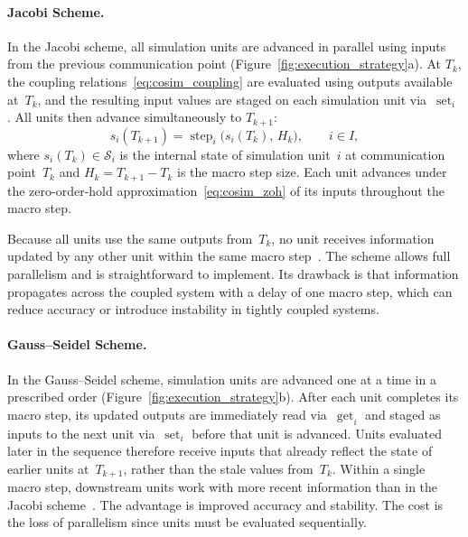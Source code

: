 \paragraph{Jacobi Scheme.}
In the Jacobi scheme, all simulation units are advanced in parallel using inputs from the previous communication point (Figure~\ref{fig:execution_strategy}a).
At $T_k$, the coupling relations~\eqref{eq:cosim_coupling} are evaluated using outputs available at~$T_k$, and the resulting input values are staged on each simulation unit via~$\operatorname{set}_i$.
All units then advance simultaneously to $T_{k+1}$:
\begin{equation}
    s_i(T_{k+1}) = \operatorname{step}_i\!\bigl(s_i(T_k),\, H_k\bigr),
    \qquad i \in I,
    \label{eq:jacobi_step}
\end{equation}
where $s_i(T_k) \in \mathcal{S}_i$ is the internal state of simulation unit~$i$ at communication point~$T_k$ and $H_k = T_{k+1} - T_k$ is the macro step size.
Each unit advances under the zero-order-hold approximation~\eqref{eq:cosim_zoh}
of its inputs throughout the macro step.

Because all units use the same outputs from~$T_k$, no unit receives information updated by any other unit within the same macro step~\cite{petridis_test_2015}.
The scheme allows full parallelism and is straightforward to implement.
Its drawback is that information propagates across the coupled system with a delay of one macro step, which can reduce accuracy or introduce instability in tightly coupled systems.

\paragraph{Gauss--Seidel Scheme.}
In the Gauss--Seidel scheme, simulation units are advanced one at a time in a prescribed order (Figure~\ref{fig:execution_strategy}b).
After each unit completes its macro step, its updated outputs are immediately read via~$\operatorname{get}_i$ and staged as inputs to the next unit via~$\operatorname{set}_i$ before that unit is advanced.
Units evaluated later in the sequence therefore receive inputs that already reflect the state of earlier units at~$T_{k+1}$, rather than the stale values from~$T_k$.
Within a single macro step, downstream units work with more recent information than in the Jacobi scheme~\cite{petridis_test_2015,gomes_co-simulation_2019}.
The advantage is improved accuracy and stability.
The cost is the loss of parallelism since units must be evaluated
sequentially.

